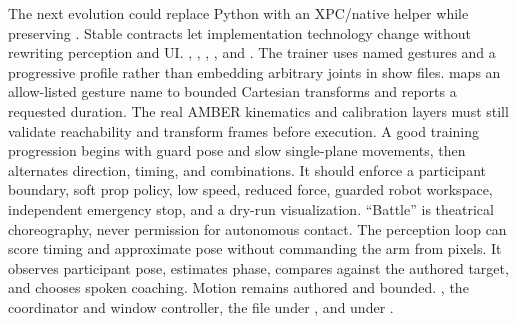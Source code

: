 {}The next evolution could replace Python with an XPC/native helper while preserving . Stable contracts let implementation technology change without rewriting perception and UI.\markdownRendererInterblockSeparator
{}
\markdownRendererSectionEnd \markdownRendererSectionBegin
{}\markdownRendererInterblockSeparator
{}\markdownRendererBlockQuoteBegin
{} , , , , and .\markdownRendererBlockQuoteEnd \markdownRendererInterblockSeparator
{}The trainer uses named gestures and a progressive profile rather than embedding arbitrary joints in show files.  maps an allow-listed gesture name to bounded Cartesian transforms and reports a requested duration. The real AMBER kinematics and calibration layers must still validate reachability and transform frames before execution.\markdownRendererParagraphSeparator
{}A good training progression begins with guard pose and slow single-plane movements, then alternates direction, timing, and combinations. It should enforce a participant boundary, soft prop policy, low speed, reduced force, guarded robot workspace, independent emergency stop, and a dry-run visualization. “Battle” is theatrical choreography, never permission for autonomous contact.\markdownRendererParagraphSeparator
{}The perception loop can score timing and approximate pose without commanding the arm from pixels. It observes participant pose, estimates phase, compares against the authored target, and chooses spoken coaching. Motion remains authored and bounded.\markdownRendererInterblockSeparator
{}
\markdownRendererSectionEnd \markdownRendererSectionBegin
{}\markdownRendererInterblockSeparator
{}\markdownRendererBlockQuoteBegin
{} , the coordinator and window controller, the  file under , and  under .\markdownRendererBlockQuoteEnd \markdownRendererInterblockSeparator
